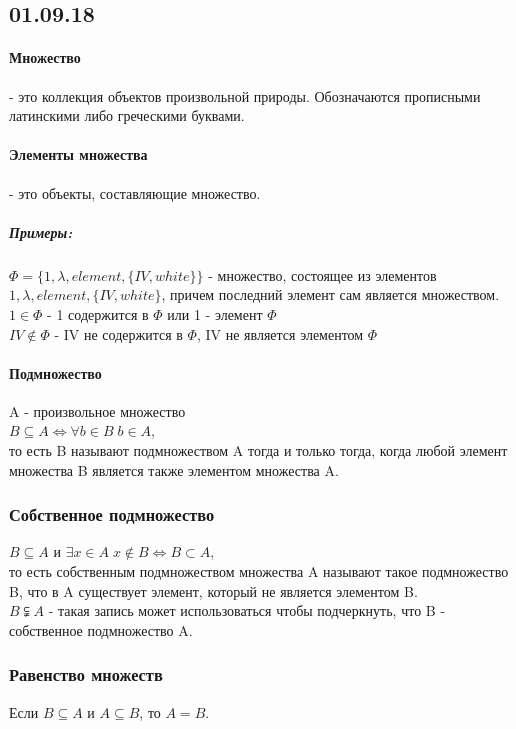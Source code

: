 \subsection{01.09.18}
\paragraph{Множество}
- это коллекция объектов произвольной природы. Обозначаются прописными латинскими либо греческими буквами.
\paragraph{Элементы множества}
- это объекты, составляющие множество.
\subparagraph*{Примеры:}
$\Phi = \{1, \lambda, element, \{IV, white\}\}$ - множество, состоящее из элементов $1, \lambda, element, \{IV, white\}$, причем последний элемент сам является множеством. \\
$1 \in \Phi$ - 1 содержится в $\Phi$ или 1 - элемент $\Phi$\\
$IV \not\in \Phi$ - IV не содержится в $\Phi$, IV не является элементом $\Phi$
\paragraph{Подмножество}
$\;$ \\ A - произвольное множество\\
$B \subseteq A \Leftrightarrow \forall b \in B \; b \in A$, \\
то есть B называют подмножеством A тогда и только тогда, когда любой элемент множества B является также элементом множества A.
\subsubsection{Собственное подмножество}
$\;$ \\ $B \subseteq A$ и $\exists x \in A \; x \not\in B \Leftrightarrow B \subset A$, \\
то есть собственным подмножеством множества A называют такое подмножество B, что в A существует элемент, который не является элементом B.\\
$B \subsetneqq A$ - такая запись может использоваться чтобы подчеркнуть, что B - собственное подмножество A.
\subsubsection{Равенство множеств}
$\;$ \\ Если $B \subseteq A$ и $A \subseteq B$, то $A = B$.
